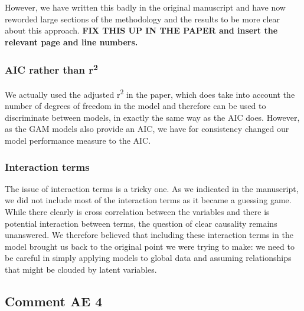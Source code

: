 \documentclass[]{elsarticle} %
\begin{document}
However, we have written this badly in the original manuscript and have now reworded large sections of the methodology and the results to be more clear about this approach. \textbf{FIX THIS UP IN THE PAPER and insert the relevant page and line numbers.}

\hypertarget{aic-rather-than-r2}{%
\subsubsection{\texorpdfstring{AIC rather than r\textsuperscript{2}}{AIC rather than r2}}\label{aic-rather-than-r2}}

We actually used the adjusted r\textsuperscript{2} in the paper, which does take into account the number of degrees of freedom in the model and therefore can be used to discriminate between models, in exactly the same way as the AIC does. However, as the GAM models also provide an AIC, we have for consistency changed our model performance measure to the AIC.

\hypertarget{interaction-terms}{%
\subsubsection{Interaction terms}\label{interaction-terms}}

The issue of interaction terms is a tricky one. As we indicated in the manuscript, we did not include most of the interaction terms as it became a guessing game. While there clearly is cross correlation between the variables and there is potential interaction between terms, the question of clear causality remains unanswered. We therefore believed that including these interaction terms in the model brought us back to the original point we were trying to make: we need to be careful in simply applying models to global data and assuming relationships that might be clouded by latent variables.\\

\hypertarget{comment-ae-4}{%
\subsection{Comment AE 4}\label{comment-ae-4}}
\end{document}
